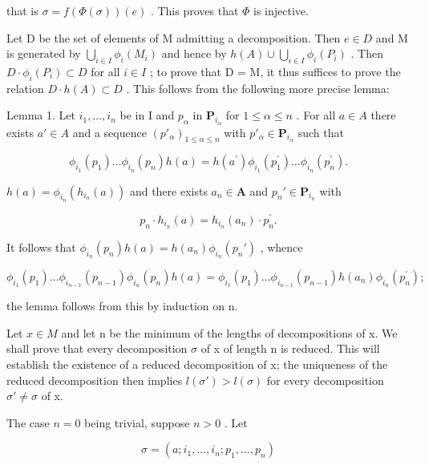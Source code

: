 that is \(\sigma = f(\Phi(\sigma))(e)\) . This proves that \(\Phi\) is injective.


Let D be the set of elements of M admitting a decomposition. Then \(e \in D\) and M is generated by \(\bigcup_{i \in I} \phi_i(M_i)\) and hence by \(h(A) \cup \bigcup_{i \in I} \phi_i(P_i)\) . Then \(D \cdot \phi_i(P_i) \subset D\) for all \(i \in I\) ; to prove that D = M, it thus suffices to prove the relation \(D \cdot h(A) \subset D\) . This follows from the following more precise lemma:

Lemma 1. Let \(i_1, \ldots, i_n\) be in I and \(p_\alpha\) in \(\mathbf{P}_{i_\alpha}\) for \(1 \leqslant \alpha \leqslant n\) . For all \(a \in A\) there exists \(a' \in A\) and a sequence \((p'_\alpha)_{1 \leqslant \alpha \leqslant n}\) with \(p'_\alpha \in \mathbf{P}_{i_\alpha}\) such that

\[
\phi_ {i _ {1}} (p _ {1}) \dots \phi_ {i _ {n}} (p _ {n}) h (a) = h (a ^ {\prime}) \phi_ {i _ {1}} (p _ {1} ^ {\prime}) \dots \phi_ {i _ {n}} (p _ {n} ^ {\prime}).
\]

\(h(a) = \phi_{i_n}(h_{i_n}(a))\) and there exists \(a_{n} \in \mathbf{A}\) and \(p_n' \in \mathbf{P}_{i_n}\) with

\[
p _ {n} \cdot h _ {i _ {n}} (a) = h _ {i _ {n}} (a _ {n}) \cdot p _ {n} ^ {\prime}.
\]

It follows that \(\phi_{i_n}(p_n)h(a) = h(a_n)\phi_{i_n}(p_n')\) , whence

\[
\phi_ {i _ {1}} (p _ {1}) \dots \phi_ {i _ {n - 1}} (p _ {n - 1}) \phi_ {i _ {n}} (p _ {n}) h (a) = \phi_ {i _ {1}} (p _ {1}) \dots \phi_ {i _ {n - 1}} (p _ {n - 1}) h (a _ {n}) \phi_ {i _ {n}} (p _ {n} ^ {\prime});
\]

the lemma follows from this by induction on n.


Let \(x \in M\) and let n be the minimum of the lengths of decompositions of x. We shall prove that every decomposition \(\sigma\) of x of length n is reduced. This will establish the existence of a reduced decomposition of x; the uniqueness of the reduced decomposition then implies \(l(\sigma') > l(\sigma)\) for every decomposition \(\sigma' \neq \sigma\) of x.

The case \(n = 0\) being trivial, suppose \(n > 0\) . Let

\[
\sigma = (a; i _ {1}, \dots , i _ {n}; p _ {1}, \dots , p _ {n})
\]

